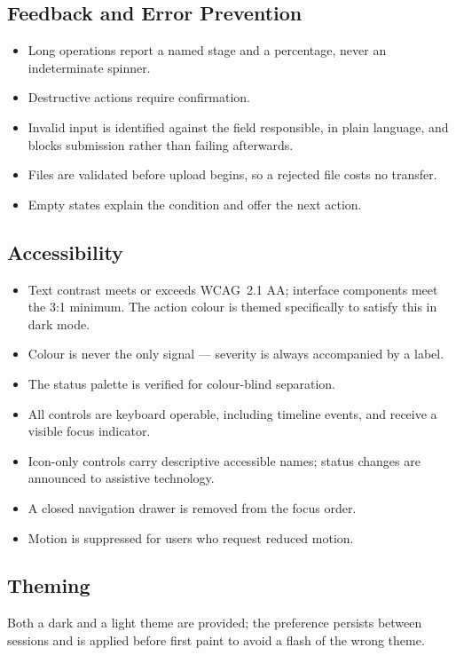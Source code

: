 \documentclass[12pt,a4paper,twoside]{article}
\begin{document}
\subsection{Feedback and Error Prevention}

\begin{itemize}[nosep]
\item Long operations report a named stage and a percentage, never an indeterminate
spinner.
\item Destructive actions require confirmation.
\item Invalid input is identified against the field responsible, in plain language, and
blocks submission rather than failing afterwards.
\item Files are validated before upload begins, so a rejected file costs no transfer.
\item Empty states explain the condition and offer the next action.
\end{itemize}

\subsection{Accessibility}

\begin{itemize}[nosep]
\item Text contrast meets or exceeds WCAG~2.1 AA; interface components meet the 3:1
minimum. The action colour is themed specifically to satisfy this in dark mode.
\item Colour is never the only signal --- severity is always accompanied by a label.
\item The status palette is verified for colour-blind separation.
\item All controls are keyboard operable, including timeline events, and receive a
visible focus indicator.
\item Icon-only controls carry descriptive accessible names; status changes are
announced to assistive technology.
\item A closed navigation drawer is removed from the focus order.
\item Motion is suppressed for users who request reduced motion.
\end{itemize}

\subsection{Theming}

Both a dark and a light theme are provided; the preference persists between sessions
and is applied before first paint to avoid a flash of the wrong theme.
\end{document}
